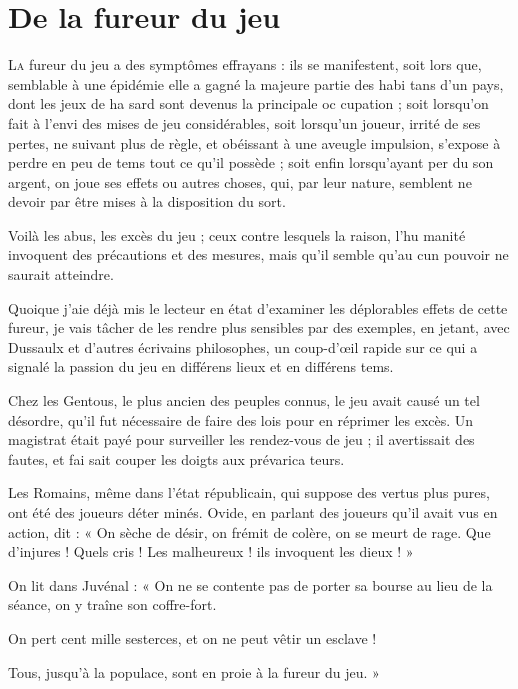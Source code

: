 \chapter[De la Fureur du Jeu]{De la fureur du jeu}

\lettrine{L}{a} fureur du jeu a des symptômes
effrayans : ils se manifestent, soit lors%
que, semblable à une épidémie elle
a gagné la majeure partie des habi%
tans d'un pays, dont les jeux de ha%
sard sont devenus la principale oc%
cupation ; soit lorsqu'on fait à l'envi
des mises de jeu considérables, soit
lorsqu'un joueur, irrité de ses pertes,
ne suivant plus de règle, et obéissant
à une aveugle impulsion, s'expose à
perdre en peu de tems tout ce qu'il
possède ; soit enfin lorsqu'ayant per%
du son argent, on joue ses effets ou
autres choses, qui, par leur nature,
semblent ne devoir par être mises à la
disposition du sort.

Voilà les abus, les excès du jeu ;
ceux contre lesquels la raison, l'hu%
manité invoquent des précautions et
des mesures, mais qu'il semble qu'au%
cun pouvoir ne saurait atteindre.

Quoique j'aie déjà mis le lecteur
en état d'examiner les déplorables
effets de cette fureur, je vais tâcher
de les rendre plus sensibles par des
exemples, en jetant, avec Dussaulx
et d'autres écrivains philosophes, un
coup-d'œil rapide sur ce qui a signalé
la passion du jeu en différens lieux
et en différens tems.

Chez les Gentous, le plus ancien
des peuples connus, le jeu avait causé
un tel désordre, qu'il fut nécessaire
de faire des lois pour en réprimer
les excès. Un magistrat était payé
pour surveiller les rendez-vous de
jeu ; il avertissait des fautes, et fai%
sait couper les doigts aux prévarica%
teurs.

Les Romains, même dans l'état
républicain, qui suppose des vertus
plus pures, ont été des joueurs déter%
minés. Ovide, en parlant des joueurs
qu'il avait vus en action, dit : « On
sèche de désir, on frémit de colère,
on se meurt de rage. Que d'injures !
Quels cris ! Les malheureux ! ils
invoquent les dieux ! »

On lit dans Juvénal : « On ne se
contente pas de porter sa bourse
au lieu de la séance, on y traîne
son coffre-fort.

On pert cent mille sesterces, et
on ne peut vêtir un esclave !

Tous, jusqu'à la populace, sont
en proie à la fureur du jeu. »

